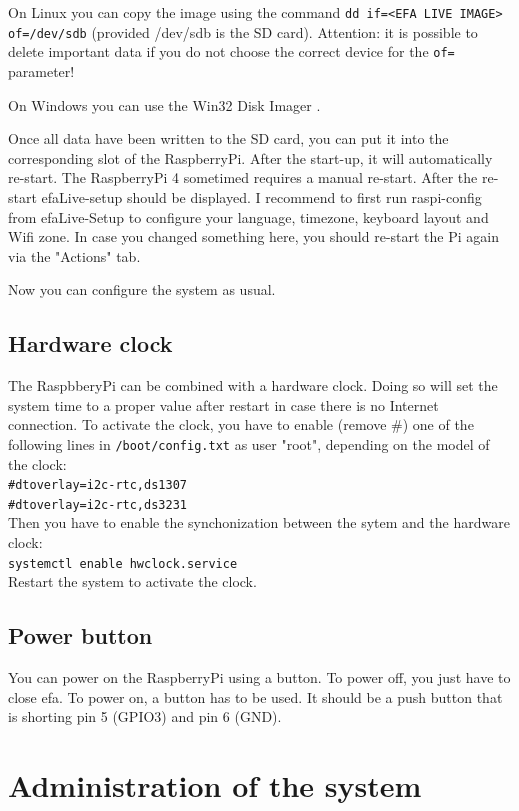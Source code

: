 \documentclass[a4paper,12pt,twoside]{article}
\begin{document}
On Linux you can copy the image using the command \texttt{dd
if={\textless}EFA LIVE IMAGE{\textgreater} of=/dev/sdb}
(provided /dev/sdb is the SD card). Attention: it is possible to
delete important data if you do not choose the correct device for the
\texttt{of=} parameter!

On Windows you can use the Win32 Disk Imager \cite{IMG1}.

Once all data have been written to the SD card, you can put it into the
corresponding slot of the RaspberryPi. After the start-up, it will automatically re-start. The RaspberryPi 4 
sometimed requires a manual re-start. After the re-start efaLive-setup should be displayed. I recommend to first
run raspi-config from efaLive-Setup to configure your language, timezone, keyboard layout and Wifi zone. In case you 
changed something here, you should re-start the Pi again via the "Actions" tab.

Now you can configure the system as usual.


\subsection{Hardware clock}
\label{sct:raspi_hardware_clock}
The RaspbberyPi can be combined with a hardware clock. Doing so will set the system time to a proper
value after restart in case there is no Internet connection. To activate the clock, you have to enable
(remove \#) one of the following lines in \texttt{/boot/config.txt} as user "root", depending on the
model of the clock:
\bigskip
\\
\texttt{\#dtoverlay=i2c-rtc,ds1307\\
\#dtoverlay=i2c-rtc,ds3231}
\bigskip
\\
Then you have to enable the synchonization between the sytem and the hardware clock:
\bigskip
\\
\texttt{systemctl enable hwclock.service}
\bigskip
\\
Restart the system to activate the clock.


\subsection{Power button}
\label{sct:raspi_power_button}
You can power on the RaspberryPi using a button. To power off, you just have to close efa. To power on, a
button has to be used. It should be a push button that is shorting pin 5 (GPIO3) and pin 6 (GND).


\section{Administration of the system}
\label{sct:administration}
\end{document}
